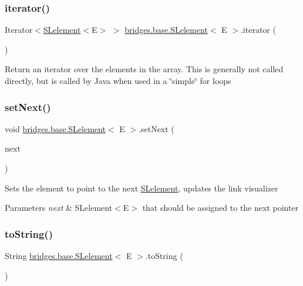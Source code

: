 \subsubsection{\texorpdfstring{iterator()}{iterator()}}
{\footnotesize\ttfamily Iterator$<$\mbox{\hyperlink{classbridges_1_1base_1_1_s_lelement}{S\+Lelement}}$<$E$>$ $>$ \mbox{\hyperlink{classbridges_1_1base_1_1_s_lelement}{bridges.\+base.\+S\+Lelement}}$<$ E $>$.iterator (\begin{DoxyParamCaption}{ }\end{DoxyParamCaption})}

Return an iterator over the elements in the array. This is generally not called directly, but is called by Java when used in a \char`\"{}simple\char`\"{} for loops \mbox{\label{classbridges_1_1base_1_1_s_lelement_afdd42f03071b2614822b73729e1a5a1a}} 
\subsubsection{\texorpdfstring{set\+Next()}{setNext()}}
{\footnotesize\ttfamily void \mbox{\hyperlink{classbridges_1_1base_1_1_s_lelement}{bridges.\+base.\+S\+Lelement}}$<$ E $>$.set\+Next (\begin{DoxyParamCaption}\item[{\mbox{\hyperlink{classbridges_1_1base_1_1_s_lelement}{S\+Lelement}}$<$ E $>$}]{next }\end{DoxyParamCaption})}

Sets the element to point to the next \mbox{\hyperlink{classbridges_1_1base_1_1_s_lelement}{S\+Lelement}}, updates the link visualizer


\begin{DoxyParams}{Parameters}
{\em next} & S\+Lelement$<$\+E$>$ that should be assigned to the next pointer \\
\hline
\end{DoxyParams}
\mbox{\label{classbridges_1_1base_1_1_s_lelement_af0ec4da5b29d0f5ab6ab38e91cca51f9}} 
\subsubsection{\texorpdfstring{to\+String()}{toString()}}
{\footnotesize\ttfamily String \mbox{\hyperlink{classbridges_1_1base_1_1_s_lelement}{bridges.\+base.\+S\+Lelement}}$<$ E $>$.to\+String (\begin{DoxyParamCaption}{ }\end{DoxyParamCaption})}



